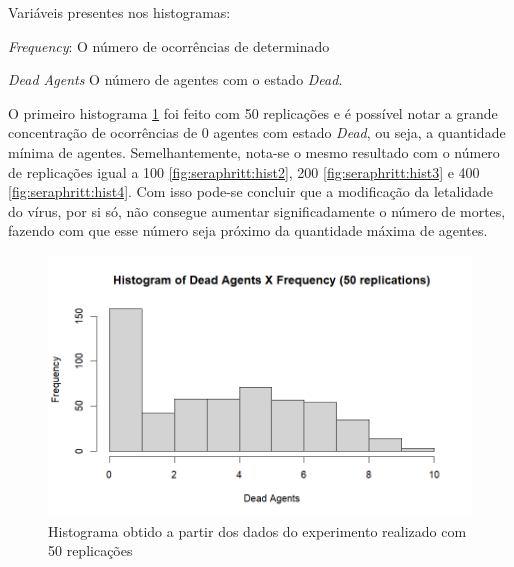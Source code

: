 Variáveis presentes nos histogramas:
\begin{description}
\item\textit{ Frequency}: O número de ocorrências de determinado 
\item \textit{Dead Agents} O número de agentes com o estado \textit{Dead}.
\end{description}

O primeiro histograma \ref{fig:seraphritt:hist1} foi feito com 50 replicações e é possível notar a grande concentração de ocorrências de 0 agentes com estado \textit{Dead}, ou seja, a quantidade mínima de agentes.
Semelhantemente, nota-se o mesmo resultado com o número de replicações igual a 100 \ref{fig:seraphritt:hist2}, 200 \ref{fig:seraphritt:hist3} e 400 \ref{fig:seraphritt:hist4}. Com isso pode-se concluir que a modificação da letalidade do vírus, por si só, não consegue aumentar significadamente o número de mortes, fazendo com que esse número seja próximo da quantidade máxima de agentes.  

\begin{figure}[H]
    \centering
    \includegraphics[angle=0,width=1\textwidth]{exploratory-data-analysis/seraphritt/PesqBibliogr/Virus-Network/Hist_50_repl.png}
    \caption{Histograma obtido a partir dos dados do experimento realizado com 50 replicações}
    \label{fig:seraphritt:hist1}
\end{figure}


